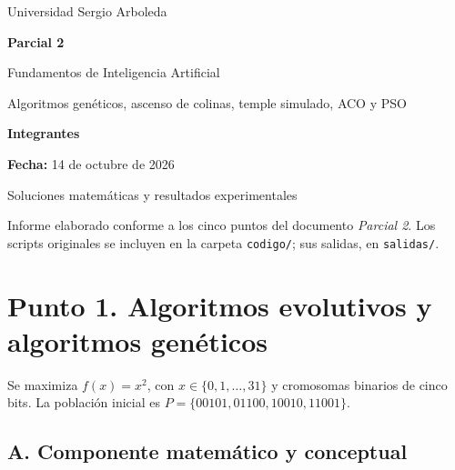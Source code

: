 \documentclass[11pt,a4paper]{article}
\begin{document}
\begin{titlepage}
\centering
\vspace*{2.1cm}
{\Large Universidad Sergio Arboleda\par}
\vspace{1.2cm}
{\Huge\bfseries Parcial 2\par}
\vspace{.4cm}
{\LARGE Fundamentos de Inteligencia Artificial\par}
\vspace{.6cm}
{\large Algoritmos genéticos, ascenso de colinas, temple simulado, ACO y PSO\par}
\vspace{1.7cm}
{\large\bfseries Integrantes\par}
\vspace{.35cm}
{\large\bfseries Fecha:} 14 de octubre de 2026\par
\vfill
{\large Soluciones matemáticas y resultados experimentales\par}
\vspace{.7cm}
{\small Informe elaborado conforme a los cinco puntos del documento \emph{Parcial 2}. Los scripts originales se incluyen en la carpeta \texttt{codigo/}; sus salidas, en \texttt{salidas/}.\par}
\end{titlepage}

\section{Punto 1. Algoritmos evolutivos y algoritmos genéticos}
Se maximiza $f(x)=x^2$, con $x\in\{0,1,\ldots,31\}$ y cromosomas binarios de cinco bits. La población inicial es $P=\{00101,01100,10010,11001\}$.
\subsection{A. Componente matemático y conceptual}
\end{document}
